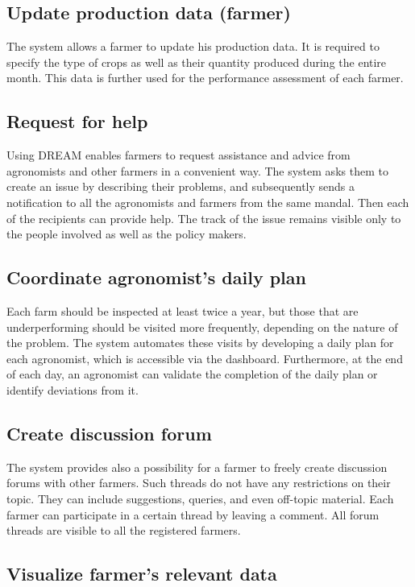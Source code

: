 \subsection{Update production data (farmer)}

The system allows a farmer to update his production data. It is required to specify the type of crops as well as their quantity produced during the entire month. This data is further used for the performance assessment of each farmer.

\subsection{Request for help}

Using DREAM enables farmers to request assistance and advice from agronomists and other farmers in a convenient way. The system asks them to create an issue by describing their problems, and subsequently sends a notification to all the agronomists and farmers from the same mandal. Then each of the recipients can provide help. The track of the issue remains visible only to the people involved as well as the policy makers.

\subsection{Coordinate agronomist's daily plan}

Each farm should be inspected at least twice a year, but those that are underperforming should be visited more frequently, depending on the nature of the problem. The system automates these visits by developing a daily plan for each agronomist, which is accessible via the dashboard. Furthermore, at the end of each day, an agronomist can validate the completion of the daily plan or identify deviations from it.

\subsection{Create discussion forum}

The system provides also a possibility for a farmer to freely create discussion forums with other farmers. Such threads do not have any restrictions on their topic. They can include suggestions, queries, and even off-topic material. Each farmer can participate in a certain thread by leaving a comment. All forum threads are visible to all the registered farmers.

\subsection{Visualize farmer's relevant data}


